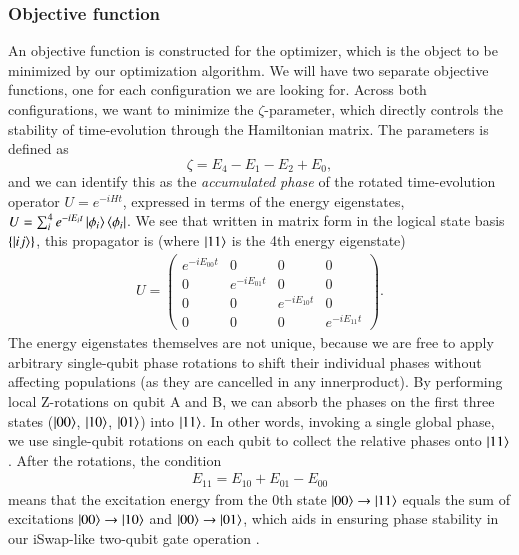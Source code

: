 \documentclass{subfiles}
\begin{document}
\subsubsection{Objective function}
An objective function is constructed for the optimizer, which is the object to be minimized by our optimization algorithm. We will have two separate objective functions, one for each configuration we are looking for. Across both configurations, we want to minimize the $\zeta$-parameter, which directly controls the stability of time-evolution through the Hamiltonian matrix. The parameters is defined as 
\begin{equation*}
    \zeta = E_4 - E_1 - E_2 + E_0,
\end{equation*}
and we can identify this as the \emph{accumulated phase} of the rotated time-evolution operator $U = e^{-iHt}$, expressed in terms of the energy eigenstates, $U = \sum_i^4 e^{-iE_it}\ket{\phi_i}\bra{\phi_i}$. We see that written in matrix form in the logical state basis $\{\ket{ij}\}$, this propagator is (where $\ket{11}$ is the 4th energy eigenstate)
\begin{align*}
    U = \begin{pmatrix}
        e^{-iE_{00}t} & 0 & 0 & 0 \\
        0 & e^{-iE_{01}t} & 0 & 0 \\
        0 & 0 & e^{-iE_{10}t} & 0 \\
        0 & 0 & 0 & e^{-iE_{11}t}
    \end{pmatrix}.
\end{align*}
The energy eigenstates themselves are not unique, because we are free to apply arbitrary single-qubit phase rotations to shift their individual phases without affecting populations (as they are cancelled in any innerproduct). By performing local Z-rotations on qubit A and B, we can absorb the phases on the first three states ($\ket{00}$, $\ket{10}$, $\ket{01}$) into $\ket{11}$. In other words, invoking a single global phase, we use single-qubit rotations on each qubit to collect the relative phases onto $\ket{11}$. After the rotations, the condition
\begin{align*}
    E_{11} = E_{10} + E_{01} - E_{00}
\end{align*}
means that the excitation energy from the 0th state $\ket{00}\to\ket{11}$ equals the sum of excitations $\ket{00}\to\ket{10}$ and $\ket{00}\to\ket{01}$, which aids in ensuring phase stability in our iSwap-like two-qubit gate operation \cite{ku2020suppression}. 
\\
\end{document}
